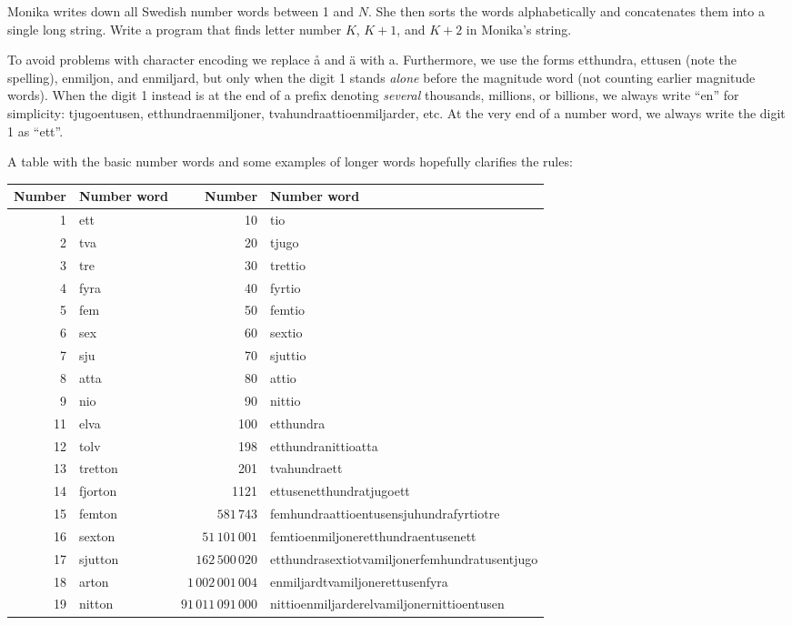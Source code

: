 
Monika writes down all Swedish number words between 1 and $N$. She then sorts the words alphabetically and concatenates them into a single long string. Write a program that finds letter number $K$, $K+1$, and $K+2$ in Monika's string.

To avoid problems with character encoding we replace å and ä with a. Furthermore, we use the forms etthundra, ettusen (note the spelling), enmiljon, and enmiljard, but only when the digit 1 stands \emph{alone} before the magnitude word (not counting earlier magnitude words). When the digit 1 instead is at the end of a prefix denoting \emph{several} thousands, millions, or billions, we always write ``en'' for simplicity: tjugoentusen, etthundraenmiljoner, tvahundraattioenmiljarder, etc. At the very end of a number word, we always write the digit 1 as ``ett''.

A table with the basic number words and some examples of longer words hopefully clarifies the rules:

\begin{tabular}{|r|l||r|l|} \hline
{\bf Number} & {\bf Number word} & {\bf Number} & {\bf Number word} \\ \hline
1 & ett & 10 & tio\\
2 & tva & 20 & tjugo\\
3 & tre & 30 & trettio\\
4 & fyra & 40 & fyrtio\\
5 & fem & 50 & femtio\\
6 & sex & 60 & sextio\\
7 & sju & 70 & sjuttio\\
8 & atta & 80 & attio\\
9 & nio & 90 & nittio\\
11 & elva & 100 & etthundra\\
12 & tolv & 198 & etthundranittioatta\\
13 & tretton & 201 & tvahundraett\\
14 & fjorton & 1121 & ettusenetthundratjugoett\\
15 & femton & $581\,743$ & femhundraattioentusensjuhundrafyrtiotre \\
16 & sexton & $51\,101\,001$ & femtioenmiljoneretthundraentusenett\\
17 & sjutton & $162\,500\,020$ & etthundrasextiotvamiljonerfemhundratusentjugo\\
18 & arton & $1\,002\,001\,004$ & enmiljardtvamiljonerettusenfyra\\
19 & nitton & $91\,011\,091\,000$ & nittioenmiljarderelvamiljonernittioentusen\\ \hline
\end{tabular}

